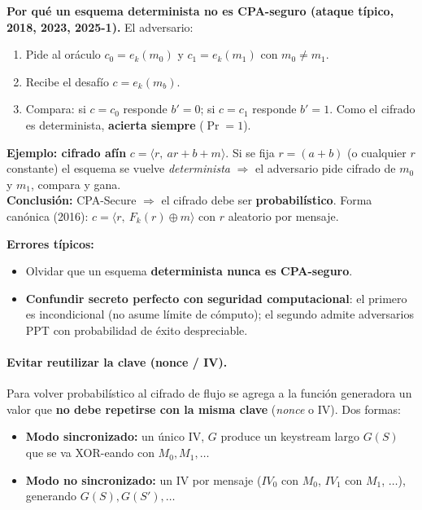 \documentclass[../main.tex]{subfiles}
\begin{document}
\begin{examen}
\textbf{Por qué un esquema determinista no es CPA-seguro (ataque típico, 2018,
2023, 2025-1).} El adversario:
\begin{enumerate}[nosep]
  \item Pide al oráculo $c_0 = e_k(m_0)$ y $c_1 = e_k(m_1)$ con $m_0\neq m_1$.
  \item Recibe el desafío $c = e_k(m_b)$.
  \item Compara: si $c=c_0$ responde $b'{=}0$; si $c=c_1$ responde $b'{=}1$.
        Como el cifrado es determinista, \textbf{acierta siempre}
        ($\Pr=1$).
\end{enumerate}
\textbf{Ejemplo: cifrado afín} $c=\langle r,\ a r + b + m\rangle$. Si se fija
$r=(a+b)$ (o cualquier $r$ constante) el esquema se vuelve \emph{determinista}
$\Rightarrow$ el adversario pide cifrado de $m_0$ y $m_1$, compara y gana.\\
\textbf{Conclusión:} CPA-Secure $\Rightarrow$ el cifrado debe ser
\textbf{probabilístico}. Forma canónica (2016): $c=\langle r,\ F_k(r)\oplus m\rangle$
con $r$ aleatorio por mensaje.
\end{examen}

\begin{ojo}
\textbf{Errores típicos:}
\begin{itemize}[nosep]
  \item Olvidar que un esquema \textbf{determinista nunca es CPA-seguro}.
  \item \textbf{Confundir secreto perfecto con seguridad computacional}: el
        primero es incondicional (no asume límite de cómputo); el segundo
        admite adversarios PPT con probabilidad de éxito despreciable.
\end{itemize}
\end{ojo}

\paragraph{Evitar reutilizar la clave (nonce / IV).}
Para volver probabilístico al cifrado de flujo se agrega a la función
generadora un valor que \textbf{no debe repetirse con la misma clave}
(\emph{nonce} o IV). Dos formas:
\begin{itemize}[nosep]
  \item \textbf{Modo sincronizado:} un único IV, $G$ produce un keystream
        largo $G(S)$ que se va XOR-eando con $M_0, M_1, \dots$
  \item \textbf{Modo no sincronizado:} un IV por mensaje
        ($IV_0$ con $M_0$, $IV_1$ con $M_1$, $\dots$), generando $G(S), G(S'),\dots$
\end{itemize}
\end{document}
